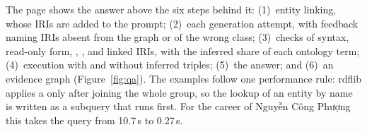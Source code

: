 The page shows the answer above the six steps behind it:
(1)~entity linking, whose IRIs are added to the prompt; (2)~each generation attempt, with feedback naming IRIs absent
from the graph or of the wrong class; (3)~checks of syntax, read-only
form, , ,  and linked IRIs, with the
inferred share of each ontology term; (4)~execution with and without inferred
triples; (5)~the answer; and (6)~an evidence graph (Figure~\ref{fig:qa}).
The examples follow one performance rule: rdflib applies a  only after
joining the whole group, so the lookup of an entity by name is written as a
subquery that runs first. For the career of Nguyễn Công Phượng this takes the
query from 10.7\,s to 0.27\,s.
